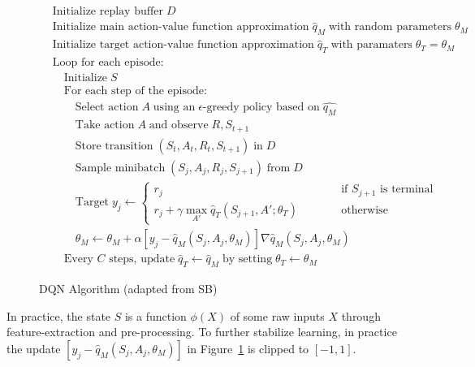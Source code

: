 \begin{figure}
\small
\begin{pseudocodebox}
\vspace{-\baselineskip}
\begin{align*}
& \text{Initialize replay buffer}\;D \\
& \text{Initialize main action-value function approximation}\;\hat{q}_M\;\text{with random parameters}\;\theta_M \\
& \text{Initialize target action-value function approximation}\;\hat{q}_T\;\text{with paramaters}\;\theta_T=\theta_M \\
& \text{Loop for each episode:}\\
& \quad \text{Initialize}\;S \\
& \quad \text{For each step of the episode:} \\
& \quad \quad \text{Select action}\; A \; \text{using an} \; \text{$\epsilon$-greedy policy based on}\; \hat{q_M}\\
& \quad \quad \text{Take action} \; A \; \text{and observe}\;R, S_{t+1} \\
& \quad \quad \text{Store transition} \; (S_t , A_t , R_t , S_{t+1} ) \; \text{in} \; D \\
& \quad \quad \text{Sample minibatch} \; (S_j , A_j , R_j , S_{j+1} ) \; \text{from} \; D \\
& \quad \quad \text{Target}\;y_j \leftarrow \begin{cases} r_j & \qquad \quad \text{if $S_{j+1}$ is terminal} \\
r_j + \gamma \operatorname*{max}_{A'} \hat{q}_T(S_{j+1}, A'; \theta_T) & \qquad \quad \text{otherwise}\end{cases} \\
& \quad \quad \theta_M \leftarrow \theta_M + \alpha [y_j - \hat{q}_M (S_j, A_j, \theta_M)] \nabla \hat{q}_M(S_j, A_j, \theta_M) \hspace{1in} \\
& \quad \text{Every $C$ steps, update}\; \hat{q}_T \leftarrow \hat{q}_M\;\text{by setting}\; \theta_T \leftarrow \theta_M
\end{align*}
\end{pseudocodebox}
\caption{DQN Algorithm (adapted from SB)}
\label{fig:dqn}
\end{figure}

In practice, the state $S$ is a function $\phi(X)$ of some raw inputs $X$ through feature-extraction and pre-processing. To further stabilize learning, in practice the update $[y_j - \hat{q}_M (S_j, A_j, \theta_M)]$ in Figure~\ref{fig:dqn} is clipped to $[-1, 1]$.

